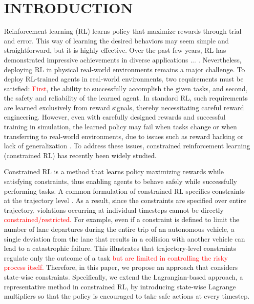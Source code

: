 \section{INTRODUCTION}

Reinforcement learning (RL) learns policy that maximize rewards through trial and error.
This way of learning the desired behaviors may seem simple and straightforward, but it is highly effective.
Over the past few years, RL has demonstrated impressive achievements in diverse applications ... \cite{silver2017mastering} \cite{andrychowicz2020learning} \cite{ouyang2022training}.
Nevertheless, deploying RL in physical real-world environments remains a major challenge.
To deploy RL-trained agents in real-world environments, two requirements must be satisfied:
\textcolor{red}{First}, the ability to successfully accomplish the given tasks, and second, the safety and reliability of the learned agent.
In standard RL, such requirements are learned exclusively from reward signals, thereby necessitating careful reward engineering.
However, even with carefully designed rewards and successful training in simulation, the learned policy may fail when tasks change or when transferring to real-world environments, due to issues such as reward hacking or lack of generalization \cite{amodei2016concrete}.
To address these issues, constrained reinforcement learning (constrained RL) has recently been widely studied.

Constrained RL is a method that learns policy maximizing rewards while satisfying constraints, thus enabling agents to behave safely while successfully performing tasks.
A common formulation of constrained RL specifies constraints at the trajectory level \cite{brunke2022safe}.
As a result, since the constraints are specified over entire trajectory, violations occurring at individual timesteps cannot be directly \textcolor{red}{constrained/restricted.}
For example, even if a constraint is defined to limit the number of lane departures during the entire trip of an autonomous vehicle, a single deviation from the lane that results in a collision with another vehicle can lead to a catastrophic failure.
This illustrates that trajectory-level constraints regulate only the outcome of a task \textcolor{red}{but are limited in controlling the risky process itself.}
Therefore, in this paper, we propose an approach that considers state-wise constraints.
Specifically, we extend the Lagrangian-based approach, a representative method in constrained RL, by introducing state-wise Lagrange multipliers so that the policy is encouraged to take safe actions at every timestep.